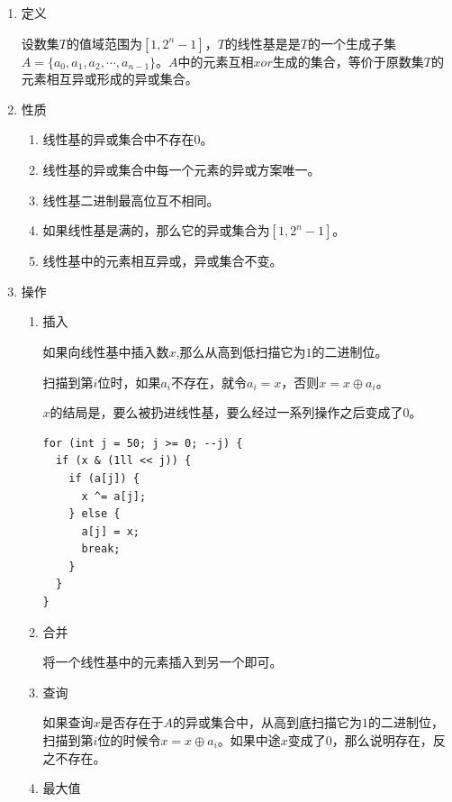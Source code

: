 \documentclass[11pt]{article}
\begin{document}
\begin{enumerate}
\item 定义
\label{sec:org226c071}

设数集\(T\)的值域范围为\([1,2^n-1]\)，\(T\)的线性基是是\(T\)的一个生成子集\(A=\{a_0,a_1,a_2,\cdots,a_{n-1}\}\)。\(A\)中的元素互相\(xor\)生成的集合，等价于原数集\(T\)的元素相互异或形成的异或集合。

\item 性质
\label{sec:org1985693}

\begin{enumerate}
\item 线性基的异或集合中不存在\(0\)。
\item 线性基的异或集合中每一个元素的异或方案唯一。
\item 线性基二进制最高位互不相同。
\item 如果线性基是满的，那么它的异或集合为\([1,2^n-1]\)。
\item 线性基中的元素相互异或，异或集合不变。
\end{enumerate}

\item 操作
\label{sec:org8dd8c9d}
\begin{enumerate}
\item 插入
\label{sec:org13b53ac}

如果向线性基中插入数\(x\),那么从高到低扫描它为\(1\)的二进制位。

扫描到第\(i\)位时，如果\(a_i\)不存在，就令\(a_i=x\)，否则\(x=x \oplus a_i\)。

\(x\)的结局是，要么被扔进线性基，要么经过一系列操作之后变成了\(0\)。

\begin{verbatim}
for (int j = 50; j >= 0; --j) {
  if (x & (1ll << j)) {
    if (a[j]) {
      x ^= a[j];
    } else {
      a[j] = x;
      break;
    }
  }
}
\end{verbatim}

\item 合并
\label{sec:org5e10034}

将一个线性基中的元素插入到另一个即可。

\item 查询
\label{sec:org2b1e568}

如果查询\(x\)是否存在于\(A\)的异或集合中，从高到底扫描它为\(1\)的二进制位，扫描到第\(i\)位的时候令\(x=x \oplus a_i\)。如果中途\(x\)变成了\(0\)，那么说明存在，反之不存在。

\item 最大值
\label{sec:orgf12507e}


\end{enumerate}
\end{enumerate}
\end{document}
